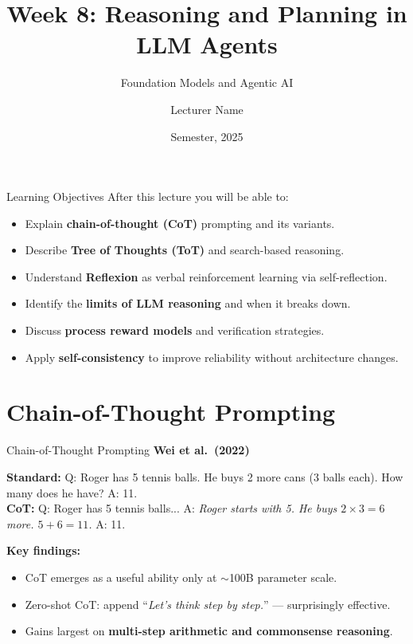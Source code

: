 \documentclass[aspectratio=169,10pt]{beamer}
\title{Week 8: Reasoning and Planning in LLM Agents}
\subtitle{Foundation Models and Agentic AI}
\author{Lecturer Name}
\institute{Holon Institute of Technology (HIT)}
\date{Semester, 2025}
\begin{document}
\begin{frame}
  \titlepage
\end{frame}

\begin{frame}{Learning Objectives}
  After this lecture you will be able to:
  \begin{itemize}
    \item Explain \textbf{chain-of-thought (CoT)} prompting and its variants.
    \item Describe \textbf{Tree of Thoughts (ToT)} and search-based reasoning.
    \item Understand \textbf{Reflexion} as verbal reinforcement learning via self-reflection.
    \item Identify the \textbf{limits of LLM reasoning} and when it breaks down.
    \item Discuss \textbf{process reward models} and verification strategies.
    \item Apply \textbf{self-consistency} to improve reliability without architecture changes.
  \end{itemize}
\end{frame}

\section{Chain-of-Thought Prompting}

\begin{frame}{Chain-of-Thought Prompting}
  \textbf{Wei et al.\ (2022)}~\cite{wei2022chain}
  \vspace{0.4em}
  \begin{tcolorbox}[hitbox, title=CoT Prompt Example]
    \textbf{Standard:} Q: Roger has 5 tennis balls. He buys 2 more cans (3 balls each). How many does he have?  A: 11.\\[6pt]
    \textbf{CoT:} Q: Roger has 5 tennis balls... A: \textit{Roger starts with 5. He buys $2 \times 3 = 6$ more. $5 + 6 = 11$.} A: 11.
  \end{tcolorbox}
  \vspace{0.4em}
  \textbf{Key findings:}
  \begin{itemize}
    \item CoT emerges as a useful ability only at $\sim$100B parameter scale.
    \item Zero-shot CoT: append ``\textit{Let's think step by step.}'' — surprisingly effective.
    \item Gains largest on \textbf{multi-step arithmetic and commonsense reasoning}.
  \end{itemize}
\end{frame}
\end{document}
